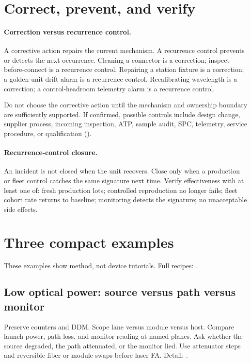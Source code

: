 \section{Correct, prevent, and verify}
\label{sec:fa-correct-prevent}

\paragraph{Correction versus recurrence control.}
A corrective action repairs the current mechanism. A recurrence control prevents
or detects the next occurrence. Cleaning a connector is a correction;
inspect-before-connect is a recurrence control. Repairing a station fixture is a
correction; a golden-unit drift alarm is a recurrence control. Recalibrating
wavelength is a correction; a control-headroom telemetry alarm is a recurrence
control.

Do not choose the corrective action until the mechanism and ownership boundary
are sufficiently supported. If confirmed, possible controls include design
change, supplier process, incoming inspection, ATP, sample audit, SPC,
telemetry, service procedure, or qualification
().

\paragraph{Recurrence-control closure.}
An incident is not closed when the unit recovers. Close only when a production
or fleet control catches the same signature next time. Verify effectiveness
with at least one of: fresh production lots; controlled reproduction no longer
fails; fleet cohort rate returns to baseline; monitoring detects the signature;
no unacceptable side effects.

\section{Three compact examples}
\label{sec:fa-compact-examples}

These examples show method, not device tutorials. Full recipes:
.

\subsection{Low optical power: source versus path versus monitor}

Preserve counters and DDM. Scope lane versus module versus host. Compare launch
power, path loss, and monitor reading at named planes. Ask whether the source
degraded, the path attenuated, or the monitor lied. Use attenuator steps and
reversible fiber or module swaps before laser FA. Detail:
.

